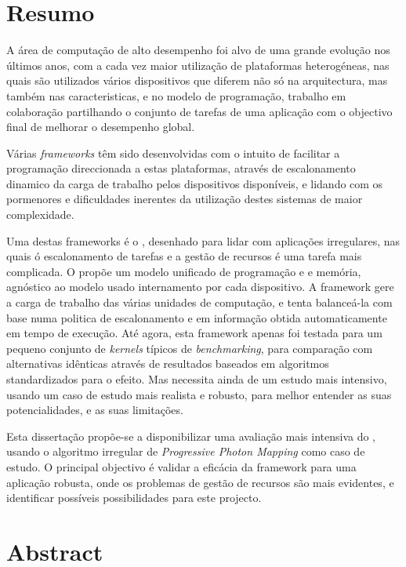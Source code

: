 \documentclass[main.tex]{subfiles}
\begin{document}
\chapter*{Resumo}

A área de computação de alto desempenho foi alvo de uma grande evolução nos últimos anos, com a cada vez maior utilização de plataformas heterogéneas, nas quais são utilizados vários dispositivos que diferem não só na arquitectura, mas também nas caracteristicas, e no modelo de programação, trabalho em colaboração partilhando o conjunto de tarefas de uma aplicação com o objectivo final de melhorar o desempenho global.

Várias \textit{frameworks} têm sido desenvolvidas com o intuito de facilitar a programação direccionada a estas plataformas, através de escalonamento dinamico da carga de trabalho pelos dispositivos disponíveis, e lidando com os pormenores e dificuldades inerentes da utilização destes sistemas de maior complexidade.

Uma destas frameworks é o \gama, desenhado para lidar com aplicações irregulares, nas quais ó escalonamento de tarefas e a gestão de recursos é uma tarefa mais complicada. O \gama propõe um modelo unificado de programação e e memória, agnóstico ao modelo usado internamento por cada dispositivo. A framework gere a carga de trabalho das várias unidades de computação, e tenta balanceá-la com base numa politica de escalonamento e em informação obtida automaticamente em tempo de execução. Até agora, esta framework apenas foi testada para um pequeno conjunto de \textit{kernels} típicos de \textit{benchmarking}, para comparação com alternativas idênticas através de resultados baseados em algoritmos standardizados para o efeito. Mas necessita ainda de um estudo mais intensivo, usando um caso de estudo mais realista e robusto, para melhor entender as suas potencialidades, e as suas limitações.

Esta dissertação propõe-se a disponibilizar uma avaliação mais intensiva do \gama, usando o algoritmo irregular de \textit{Progressive Photon Mapping} como caso de estudo. O principal objectivo é validar a eficácia da framework para uma aplicação robusta, onde os problemas de gestão de recursos são mais evidentes, e identificar possíveis possibilidades para este projecto.

\newpage {}
\chapter*{Abstract}
\end{document}
